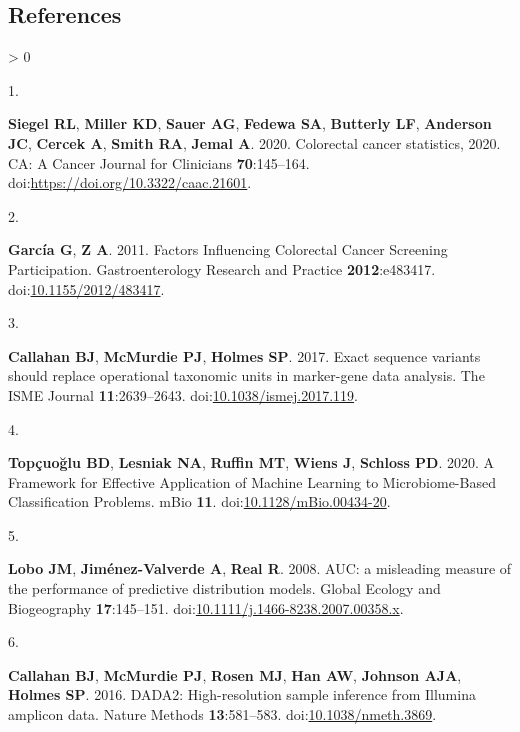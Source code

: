 \documentclass[
]{article}
\newlength{\cslhangindent}
\newlength{\csllabelwidth}
\newenvironment{CSLReferences}[2] %
 {%
  \setlength{\parindent}{0pt}
  \ifodd #1 \everypar{\setlength{\hangindent}{\cslhangindent}}\ignorespaces\fi
  \ifnum #2 > 0
  \setlength{\parskip}{#2\baselineskip}
  \fi
 }%
 {}
\newcommand{\CSLLeftMargin}[1]{\parbox[t]{\csllabelwidth}{#1}}
\newcommand{\CSLRightInline}[1]{\parbox[t]{\linewidth - \csllabelwidth}{#1}\break}
\begin{document}
\newpage

\hypertarget{references}{%
\subsection*{References}\label{references}}

\hypertarget{refs}{}
\begin{CSLReferences}{0}{1}
\leavevmode\hypertarget{ref-siegel2020}{}%
\CSLLeftMargin{1. }
\CSLRightInline{\textbf{Siegel RL}, \textbf{Miller KD}, \textbf{Sauer
AG}, \textbf{Fedewa SA}, \textbf{Butterly LF}, \textbf{Anderson JC},
\textbf{Cercek A}, \textbf{Smith RA}, \textbf{Jemal A}. 2020. Colorectal
cancer statistics, 2020. CA: A Cancer Journal for Clinicians
\textbf{70}:145--164. doi:\url{https://doi.org/10.3322/caac.21601}.}

\leavevmode\hypertarget{ref-garcuxeda2011a}{}%
\CSLLeftMargin{2. }
\CSLRightInline{\textbf{García G}, \textbf{Z A}. 2011. Factors
Influencing Colorectal Cancer Screening Participation. Gastroenterology
Research and Practice \textbf{2012}:e483417.
doi:\href{https://doi.org/10.1155/2012/483417}{10.1155/2012/483417}.}

\leavevmode\hypertarget{ref-callahan2017}{}%
\CSLLeftMargin{3. }
\CSLRightInline{\textbf{Callahan BJ}, \textbf{McMurdie PJ},
\textbf{Holmes SP}. 2017. Exact sequence variants should replace
operational taxonomic units in marker-gene data analysis. The ISME
Journal \textbf{11}:2639--2643.
doi:\href{https://doi.org/10.1038/ismej.2017.119}{10.1038/ismej.2017.119}.}

\leavevmode\hypertarget{ref-topuxe7uolu2020}{}%
\CSLLeftMargin{4. }
\CSLRightInline{\textbf{Topçuoğlu BD}, \textbf{Lesniak NA},
\textbf{Ruffin MT}, \textbf{Wiens J}, \textbf{Schloss PD}. 2020. A
Framework for Effective Application of Machine Learning to
Microbiome-Based Classification Problems. mBio \textbf{11}.
doi:\href{https://doi.org/10.1128/mBio.00434-20}{10.1128/mBio.00434-20}.}

\leavevmode\hypertarget{ref-lobo2008}{}%
\CSLLeftMargin{5. }
\CSLRightInline{\textbf{Lobo JM}, \textbf{Jiménez-Valverde A},
\textbf{Real R}. 2008. AUC: a misleading measure of the performance of
predictive distribution models. Global Ecology and Biogeography
\textbf{17}:145--151.
doi:\href{https://doi.org/10.1111/j.1466-8238.2007.00358.x}{10.1111/j.1466-8238.2007.00358.x}.}

\leavevmode\hypertarget{ref-callahan2016}{}%
\CSLLeftMargin{6. }
\CSLRightInline{\textbf{Callahan BJ}, \textbf{McMurdie PJ},
\textbf{Rosen MJ}, \textbf{Han AW}, \textbf{Johnson AJA}, \textbf{Holmes
SP}. 2016. DADA2: High-resolution sample inference from Illumina
amplicon data. Nature Methods \textbf{13}:581--583.
doi:\href{https://doi.org/10.1038/nmeth.3869}{10.1038/nmeth.3869}.}

\end{CSLReferences}
\end{document}
